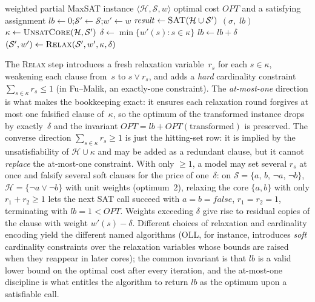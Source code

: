 \begin{algorithm}[t]
\caption{Generic Core-Guided MaxSAT}
\label{alg:cg}
\begin{algorithmic}[1]
\Require weighted partial MaxSAT instance $\langle \mathcal{H}, \mathcal{S}, w \rangle$
\Ensure optimal cost $\mathit{OPT}$ and a satisfying assignment
\State $\mathit{lb} \leftarrow 0$;\quad $\mathcal{S}' \leftarrow \mathcal{S}$;\quad $w' \leftarrow w$
\Loop
    \State $\mathit{result} \leftarrow \textsc{SAT}\!\left(\mathcal{H} \cup \mathcal{S}'\right)$
        \State \Return $(\sigma,\; \mathit{lb})$ 
    \EndIf
    \State $\kappa \leftarrow \textsc{UnsatCore}\!\left(\mathcal{H},\mathcal{S}'\right)$ 
    \State $\delta \leftarrow \min\{w'(s) : s \in \kappa\}$
    \State $\mathit{lb} \leftarrow \mathit{lb} + \delta$
    \State $(\mathcal{S}', w') \leftarrow \textsc{Relax}(\mathcal{S}', w', \kappa, \delta)$
\EndLoop
\end{algorithmic}
\end{algorithm}

The \textsc{Relax} step introduces a fresh relaxation variable~$r_s$ for each $s \in \kappa$, weakening each clause from~$s$ to $s \vee r_s$, and adds a \emph{hard} cardinality constraint $\sum_{s \in \kappa} r_s \leq 1$ (in Fu--Malik, an exactly-one constraint). The \emph{at-most-one} direction is what makes the bookkeeping exact: it ensures each relaxation round forgives at most one falsified clause of~$\kappa$, so the optimum of the transformed instance drops by exactly~$\delta$ and the invariant $\mathit{OPT} = \mathit{lb} + \mathit{OPT}(\text{transformed})$ is preserved. The converse direction $\sum_{s \in \kappa} r_s \geq 1$ is just the hitting-set row: it is implied by the unsatisfiability of $\mathcal{H} \cup \kappa$ and may be added as a redundant clause, but it cannot \emph{replace} the at-most-one constraint. With only $\geq 1$, a model may set several $r_s$ at once and falsify several soft clauses for the price of one~$\delta$: on $\mathcal{S} = \{a,\, b,\, \neg a,\, \neg b\}$, $\mathcal{H} = \{\neg a \vee \neg b\}$ with unit weights (optimum~$2$), relaxing the core $\{a, b\}$ with only $r_1 + r_2 \geq 1$ lets the next SAT call succeed with $a = b = \mathit{false}$, $r_1 = r_2 = 1$, terminating with $\mathit{lb} = 1 < \mathit{OPT}$. Weights exceeding $\delta$ give rise to residual copies of the clause with weight $w'(s) - \delta$. Different choices of relaxation and cardinality encoding yield the different named algorithms (OLL, for instance, introduces \emph{soft} cardinality constraints over the relaxation variables whose bounds are raised when they reappear in later cores); the common invariant is that $\mathit{lb}$ is a valid lower bound on the optimal cost after every iteration, and the at-most-one discipline is what entitles the algorithm to return $\mathit{lb}$ as the optimum upon a satisfiable call.

